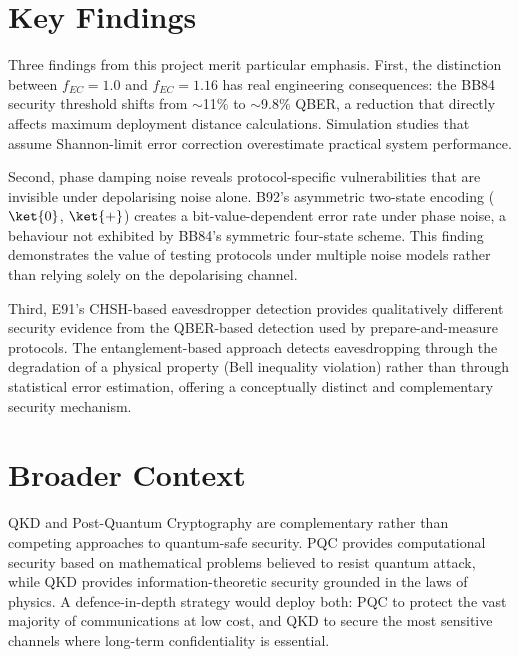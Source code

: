 


\section{Key Findings}

Three findings from this project merit particular emphasis. First, the distinction between $f_{EC} = 1.0$ and $f_{EC} = 1.16$ has real engineering consequences: the BB84 security threshold shifts from $\sim$11\% to $\sim$9.8\% QBER, a reduction that directly affects maximum deployment distance calculations. Simulation studies that assume Shannon-limit error correction overestimate practical system performance.

Second, phase damping noise reveals protocol-specific vulnerabilities that are invisible under depolarising noise alone. B92's asymmetric two-state encoding ($\ket{0}$, $\ket{+}$) creates a bit-value-dependent error rate under phase noise, a behaviour not exhibited by BB84's symmetric four-state scheme. This finding demonstrates the value of testing protocols under multiple noise models rather than relying solely on the depolarising channel.

Third, E91's CHSH-based eavesdropper detection provides qualitatively different security evidence from the QBER-based detection used by prepare-and-measure protocols. The entanglement-based approach detects eavesdropping through the degradation of a physical property (Bell inequality violation) rather than through statistical error estimation, offering a conceptually distinct and complementary security mechanism.



\section{Broader Context}

QKD and Post-Quantum Cryptography are complementary rather than competing approaches to quantum-safe security. PQC provides computational security based on mathematical problems believed to resist quantum attack, while QKD provides information-theoretic security grounded in the laws of physics. A defence-in-depth strategy would deploy both: PQC to protect the vast majority of communications at low cost, and QKD to secure the most sensitive channels where long-term confidentiality is essential.

